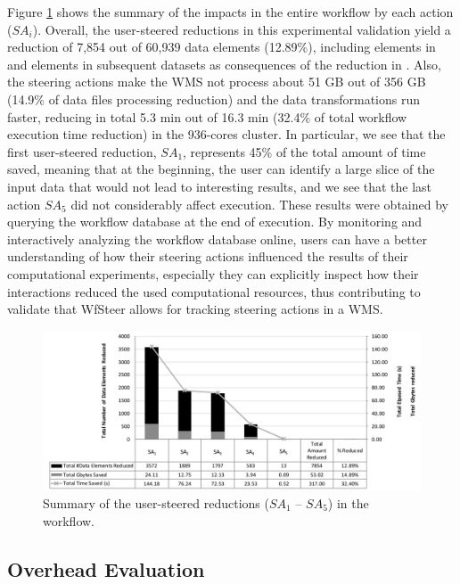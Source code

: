 Figure \ref{fig:data_red_total_elements} shows the summary of the impacts in the entire workflow by
each action ($SA_i$).
Overall, the user-steered reductions in this
experimental validation yield a reduction of 7,854 out of 60,939 data
elements (12.89\%), including elements in  and elements in
subsequent datasets as consequences of the reduction in .
Also, the steering actions make the WMS not process about 51 GB out of 356 GB (14.9\% of
data files processing reduction) and the data transformations run faster, reducing
in total 5.3 min out of 16.3 min (32.4\% of total workflow execution time
reduction) in the 936-cores cluster.
In particular, we see that the first user-steered reduction, $SA_1$, represents
45\% of the total amount of time saved, meaning that at the beginning, the user can
identify a large slice of the input data that would not lead to
interesting results, and we see that the last action $SA_5$ did
not considerably affect execution. These results were obtained by
querying the workflow database at the end of execution. By monitoring and interactively analyzing the workflow database online,
users can have a better understanding of how their steering actions influenced the results of their computational experiments, especially they can explicitly inspect how their interactions reduced the used computational resources, thus contributing to validate that WfSteer allows for tracking steering actions in a WMS.



\begin{figure}[H]
    \centering
    \includegraphics[width=\textwidth,keepaspectratio]{img/reduced-data-elements-per-DT.pdf}
    \caption{Summary of the user-steered reductions ($SA_1$ -- $SA_5$) in the workflow.}
    \label{fig:data_red_total_elements}
\end{figure}




\subsection{Overhead Evaluation}
\label{sec_dchiron_overhead_eval}


